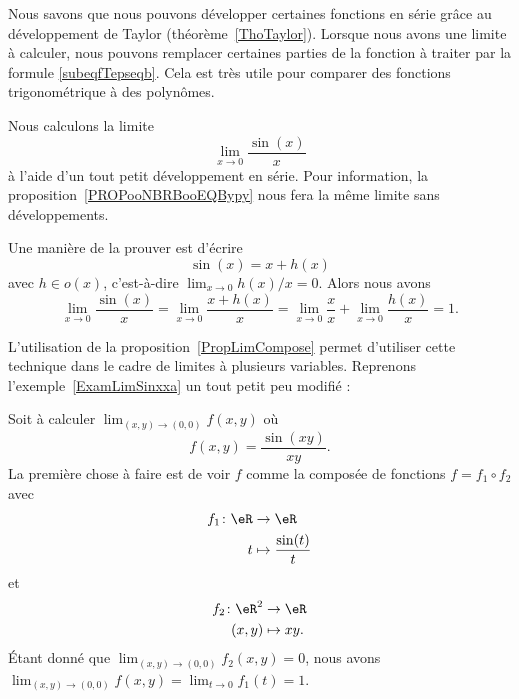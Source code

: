 Nous savons  que nous pouvons développer certaines fonctions en série grâce au développement de Taylor (théorème~\ref{ThoTaylor}). Lorsque nous avons une limite à calculer, nous pouvons remplacer certaines parties de la fonction à traiter par la formule \eqref{subeqfTepseqb}. Cela est très utile pour comparer des fonctions trigonométrique à des polynômes.

\begin{example}		\label{ExamLimSinxxa}
    Nous calculons la limite
    \begin{equation}
        \lim_{x\to 0} \frac{ \sin(x) }{ x }
    \end{equation}
    à l'aide d'un tout petit développement en série. Pour information, la proposition~\ref{PROPooNBRBooEQBypy} nous fera la même limite sans développements.

    Une manière de la prouver est d'écrire
    \begin{equation}
		\sin(x)=x+h(x)
	\end{equation}
	avec $h\in o(x)$, c'est-à-dire $\lim_{x\to 0} h(x)/x=0$. Alors nous avons
	\begin{equation}
		\lim_{x\to 0} \frac{ \sin(x) }{ x }=\lim_{x\to 0} \frac{ x+h(x) }{ x }=\lim_{x\to 0} \frac{ x }{ x }+\lim_{x\to 0} \frac{ h(x) }{ x }=1.
	\end{equation}
\end{example}

L'utilisation de la proposition~\ref{PropLimCompose} permet d'utiliser cette technique dans le cadre de limites à plusieurs variables. Reprenons l'exemple~\ref{ExamLimSinxxa} un tout petit peu modifié :

\begin{example}
	Soit à calculer $\lim_{(x,y)\to(0,0)}f(x,y)$ où
	\begin{equation}
		f(x,y)=\frac{ \sin(xy) }{ xy }.
	\end{equation}
	La première chose à faire est de voir $f$ comme la composée de fonctions $f=f_1\circ f_2$ avec
	\begin{equation}
		\begin{aligned}
			f_1\colon \eR&\to \eR \\
			t&\mapsto \frac{ \sin(t) }{ t }
		\end{aligned}
	\end{equation}
	et
	\begin{equation}
		\begin{aligned}
			f_2\colon \eR^2&\to \eR \\
			(x,y)&\mapsto xy.
		\end{aligned}
	\end{equation}
	Étant donné que $\lim_{(x,y)\to(0,0)}f_2(x,y)=0$, nous avons $\lim_{(x,y)\to(0,0)}f(x,y)=\lim_{t\to 0} f_1(t)=1$.
\end{example}

